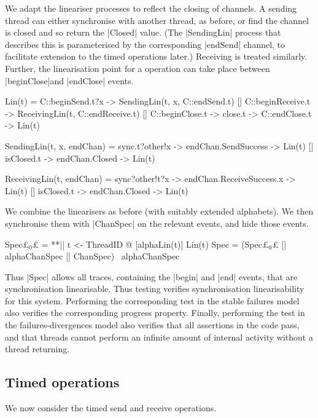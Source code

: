 We adapt the lineariser processes to reflect the closing of channels.  A
sending thread can either synchronise with another thread, as before, or find
the channel is closed and so return the |Closed| value.  (The |SendingLin|
process that describes this is parameterised by the corresponding |endSend|
channel, to facilitate extension to the timed operations later.)  Receiving is
treated similarly.  Further, the linearisation point for a 
operation can take place between |beginClose|and |endClose| events.
%
\begin{cspm}
Lin(t) = 
  C::beginSend.t?x -> SendingLin(t, x, C::endSend.t)
  [] C::beginReceive.t -> ReceivingLin(t, C::endReceive.t)
  [] C::beginClose.t -> close.t -> C::endClose.t -> Lin(t)

SendingLin(t, x, endChan) = 
  sync.t?other!x -> endChan.SendSuccess -> Lin(t)
  [] isClosed.t -> endChan.Closed -> Lin(t)

ReceivingLin(t, endChan) =  
  sync?other!t?x -> endChan.ReceiveSuccess.x -> Lin(t)
  [] isClosed.t -> endChan.Closed -> Lin(t)
\end{cspm}

We combine the linearisers as before (with suitably extended alphabets).  We
then synchronise them with |ChanSpec| on the relevant events, and hide those
events.
%
\begin{cspm}
Spec£$_0$£ = **|| t <- ThreadID @ [alphaLin(t)] Lin(t)
Spec = (Spec£$_0$£ [| alphaChanSpec |] ChanSpec) \ alphaChanSpec
\end{cspm}
%
Thus |Spec| allows all traces, containing the |begin| and |end| events, that
are synchronisation linearisable.  Thus testing \CSPM{Spec [T= System}
verifies synchronisation linearisability for this system.  Performing the
corresponding test in the stable failures model also verifies the
corresponding progress property.  Finally, performing the test in the
failures-divergences model also verifies that all assertions in the code pass,
and that threads cannot perform an infinite amount of internal activity
without a thread returning. 


\subsection{Timed operations}

\inlineScala

We now consider the timed send and receive operations.  

